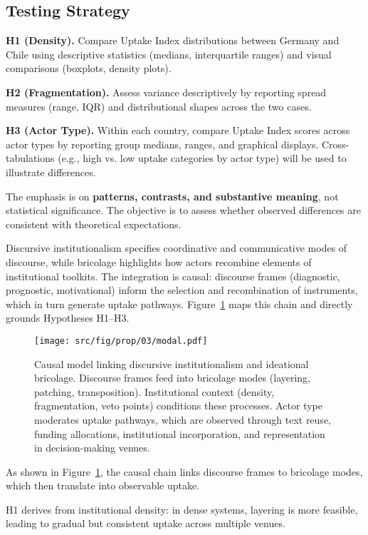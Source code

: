 \subsection*{Testing Strategy}

\textbf{H1 (Density).} Compare Uptake Index distributions between Germany and
Chile using descriptive statistics (medians, interquartile ranges) and visual
comparisons (boxplots, density plots).  

\textbf{H2 (Fragmentation).} Assess variance descriptively by reporting spread
measures (range, IQR) and distributional shapes across the two cases.  

\textbf{H3 (Actor Type).} Within each country, compare Uptake Index scores
across actor types by reporting group medians, ranges, and graphical displays.
Cross-tabulations (e.g., high vs. low uptake categories by actor type) will be
used to illustrate differences.  

The emphasis is on \textbf{patterns, contrasts, and substantive meaning}, not
statistical significance. The objective is to assess whether observed
differences are consistent with theoretical expectations.

Discursive institutionalism specifies coordinative and communicative modes of
discourse, while bricolage highlights how actors recombine elements of
institutional toolkits. The integration is causal: discourse frames (diagnostic,
prognostic, motivational) inform the selection and recombination of instruments,
which in turn generate uptake pathways. Figure~\ref{fig:causal} maps this chain
and directly grounds Hypotheses H1–H3.

\begin{figure}[h!]
  \centering
  \texttt{[image: src/fig/prop/03/modal.pdf]}
    \caption{Causal model linking discursive institutionalism and ideational
    bricolage. Discourse frames feed into bricolage modes (layering, patching,
    transposition). Institutional context (density, fragmentation, veto points)
    conditions these processes. Actor type moderates uptake pathways, which are
    observed through text reuse, funding allocations, institutional incorporation, 
    and representation in decision-making venues.}
\label{fig:causal}
\end{figure}

As shown in Figure~\ref{fig:causal}, the causal chain links discourse frames 
to bricolage modes, which then translate into observable uptake.  

H1 derives from institutional density: in dense systems, layering is more 
feasible, leading to gradual but consistent uptake across multiple venues.  


